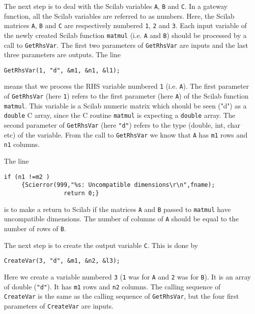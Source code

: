 \noindent
The next step is to deal with the Scilab variables \verb!A!, \verb!B! 
and \verb!C!. In a gateway function, all the Scilab variables
are referred to as numbers. Here, the Scilab matrices 
\verb!A!, \verb!B! and \verb!C! are 
respectively numbered \verb!1!, \verb!2! and \verb!3!. 
Each input variable of the newly created Scilab function
\verb!matmul! (i.e. \verb!A! and \verb!B!)
should be processed by a call to \verb!GetRhsVar!.
The first two parameters of  \verb!GetRhsVar! are inputs and the last
three parameters are outputs.
The line 
\begin{verbatim}
GetRhsVar(1, "d", &m1, &n1, &l1); 
\end{verbatim}
means that we process the RHS variable numbered \verb!1! (i.e. \verb!A!).
The first parameter of \verb!GetRhsVar! (here \verb!1!) refers to the
first parameter (here \verb!A!) of the Scilab function \verb!matmul!.
This variable is a Scilab numeric matrix which should be seen ("d") as a 
\verb!double! C array, since the C routine \verb!matmul! is
expecting a \verb!double! array. The second parameter of \verb!GetRhsVar!
(here \verb!"d"!) refers to the type (double, int, char etc) of the variable.
From the call to \verb!GetRhsVar! we know that \verb!A! has
\verb!m1! rows and \verb!n1! columns. 


\noindent
The line
\begin{verbatim}
if (n1 !=m2 ) 
     {Scierror(999,"%s: Uncompatible dimensions\r\n",fname);
                 return 0;}
\end{verbatim}
\normalsize
is to make a return to Scilab if the matrices \verb!A! and \verb!B! 
passed to \verb!matmul! have uncompatible dimensions. The number
of columns of \verb!A! should be equal to the number of rows of \verb!B!.

\noindent
The next step is to create the output variable \verb!C!. This is done by
\begin{verbatim}
CreateVar(3, "d", &m1, &n2, &l3);
\end{verbatim}
Here we create a variable numbered \verb!3! (\verb!1! was for \verb!A!
and \verb!2! was for \verb!B!). It is an array of double (\verb!"d"!).
It has \verb!m1! rows and \verb!n2! columns. 
The calling sequence of \verb!CreateVar! is the same as the calling sequence
of \verb!GetRhsVar!, but the four first parameters of \verb!CreateVar! 
are inputs. 

